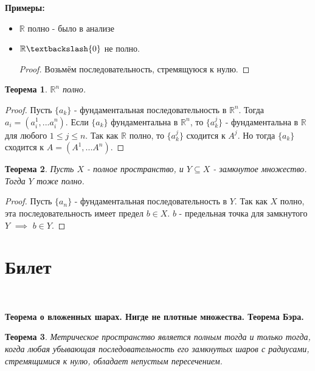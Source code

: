 \documentclass[a4paper,100pt]{article}
\theoremstyle{indented}
\newtheorem{theorem}{Теорема}
\begin{document}
\textbf{Примеры:}
\begin{itemize}
    \item $\mathbb{R}$ полно  - было в анализе
    \item $\mathbb{R} \textbackslash \{0\}$ не полно.
    \begin{proof}
    Возьмём последовательность, стремящуюся к нулю.
    \end{proof}
\end{itemize}
\begin{theorem}
$\mathbb{R}^n$ полно.
\end{theorem}
\begin{proof}
Пусть $\{a_k\}$ - фундаментальная последовательность в $\mathbb{R}^n$. Тогда $a_i=(a_i^1,...a_i^n)$.
Если $\{a_k\}$ фундаментальна в $\mathbb{R}^n$, то $\{a_k^j\}$ - фундаментальна в $\mathbb{R}$ для любого $1 \leq j \leq n$. Так как $\mathbb{R}$ полно, то $\{a_k^j\}$ сходится к $A^j$. Но тогда $\{a_k\}$ сходится к $A=(A^1,...A^n)$.
\end{proof}
\begin{theorem}
Пусть $X$ - полное пространство, и $Y \subseteq X$ - замкнутое множество. Тогда $Y$ тоже полно.
\end{theorem}
\begin{proof}
Пусть $\{a_n\}$ - фундаментальная последовательность в $Y$. Так как $X$ полно, эта последовательность имеет предел $b \in X$. $b$ - предельная точка для замкнутого $Y$ $\implies$ $b \in Y$.
\end{proof}

\section{Билет} \

\medskip

\textbf{Теорема о вложенных шарах. Нигде не плотные множества. Теорема Бэра.}\\

\begin{theorem}
    Метрическое пространство является полным тогда и только тогда, когда любая убывающая последовательность его замкнутых шаров с радиусами, стремящимися к нулю, обладает непустым пересечением.
\end{theorem}
\end{document}
